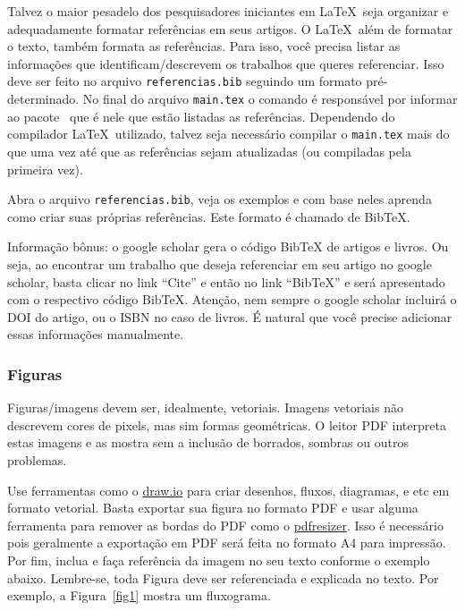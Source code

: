 \documentclass[
	article,			%
	12pt,				%
	oneside,			%
	a4paper,			%
	english,			%
	brazil,				%
	sumario=tradicional
]{abntex2}
\begin{document}
Talvez o maior pesadelo dos pesquisadores iniciantes em \LaTeX\ seja organizar e adequadamente formatar referências em seus artigos. O \LaTeX\ além de formatar o texto, também formata as referências. Para isso, você precisa listar as informações que identificam/descrevem os trabalhos que queres referenciar. Isso deve ser feito no arquivo \texttt{referencias.bib} seguindo um formato pré-determinado. No final do arquivo \texttt{main.tex} o comando \verb|| é responsável por informar ao pacote \abnTeX\ que é nele que estão listadas as referências. Dependendo do compilador \LaTeX\ utilizado, talvez seja necessário compilar o \texttt{main.tex} mais do que uma vez até que as referências sejam atualizadas (ou compiladas pela primeira vez).

Abra o arquivo \texttt{referencias.bib}, veja os exemplos e com base neles aprenda como criar suas próprias referências. Este formato é chamado de BibTeX.

Informação bônus: o google scholar gera o código BibTeX de artigos e livros. Ou seja, ao encontrar um trabalho que deseja referenciar em seu artigo no google scholar, basta clicar no link ``Cite'' e então no link ``BibTeX'' e será apresentado com o respectivo código BibTeX. Atenção, nem sempre o google scholar incluirá o DOI do artigo, ou o ISBN no caso de livros. É natural que você precise adicionar essas informações manualmente.

\subsubsection{Figuras}

Figuras/imagens devem ser, idealmente, vetoriais. Imagens vetoriais não descrevem cores de pixels, mas sim formas geométricas. O leitor PDF interpreta estas imagens e as mostra sem a inclusão de borrados, sombras ou outros problemas. 

Use ferramentas como o \href{https://draw.io}{draw.io} para criar desenhos, fluxos, diagramas, e etc em formato vetorial. Basta exportar sua figura no formato PDF e usar alguma ferramenta para remover as bordas do PDF como o \href{https://pdfresizer.com/crop}{pdfresizer}. Isso é necessário pois geralmente a exportação em PDF será feita no formato A4 para impressão. Por fim, inclua e faça referência da imagem no seu texto conforme o exemplo abaixo. Lembre-se, toda Figura deve ser referenciada e explicada no texto. Por exemplo, a Figura~\ref{fig1} mostra um fluxograma.
\end{document}
